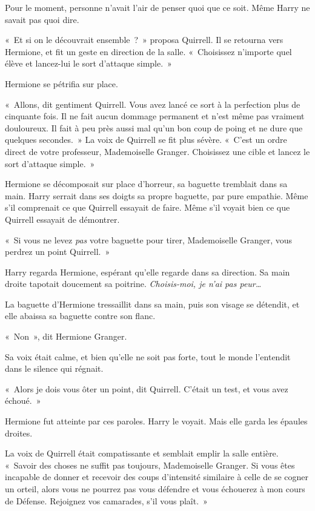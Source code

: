 Pour le moment, personne n'avait l'air de penser quoi que ce soit.
Même Harry ne savait pas quoi dire.

«~Et si on le découvrait ensemble~?~» proposa Quirrell.
Il se retourna vers Hermione, et fit un geste en direction de la salle.
«~Choisissez n'importe quel élève et lancez-lui le sort d'attaque simple.~»

Hermione se pétrifia sur place.

«~Allons, dit gentiment Quirrell.
Vous avez lancé ce sort à la perfection plus de cinquante fois.
Il ne fait aucun dommage permanent et n'est même pas vraiment douloureux.
Il fait à peu près aussi mal qu'un bon coup de poing et ne dure que quelques secondes.~»
La voix de Quirrell se fit plus sévère.
«~C'est un ordre direct de votre professeur, Mademoiselle Granger.
Choisissez une cible et lancez le sort d'attaque simple.~»

Hermione se décomposait sur place d'horreur, sa baguette tremblait dans sa main.
Harry serrait dans ses doigts sa propre baguette, par pure empathie.
Même s'il comprenait ce que Quirrell essayait de faire.
Même s'il voyait bien ce que Quirrell essayait de démontrer.

«~Si vous ne levez \emph{pas} votre baguette pour tirer, Mademoiselle Granger, vous perdrez un point Quirrell.~»

Harry regarda Hermione, espérant qu'elle regarde dans sa direction.
Sa main droite tapotait doucement sa poitrine.
\emph{Choisis-moi, je n'ai pas peur…}

La baguette d'Hermione tressaillit dans sa main, puis son visage se détendit, et elle abaissa sa baguette contre son flanc.

«~Non~», dit Hermione Granger.

Sa voix était calme, et bien qu'elle ne soit pas forte, tout le monde l'entendit dans le silence qui régnait.

«~Alors je dois vous ôter un point, dit Quirrell.
C'était un test, et vous avez échoué.~»

Hermione fut atteinte par ces paroles.
Harry le voyait.
Mais elle garda les épaules droites.

La voix de Quirrell était compatissante et semblait emplir la salle entière.
«~Savoir des choses ne suffit pas toujours, Mademoiselle Granger.
Si vous êtes incapable de donner et recevoir des coups d'intensité similaire à celle de se cogner un orteil, alors vous ne pourrez pas vous défendre et vous échouerez à mon cours de Défense.
Rejoignez vos camarades, s'il vous plaît.~»


